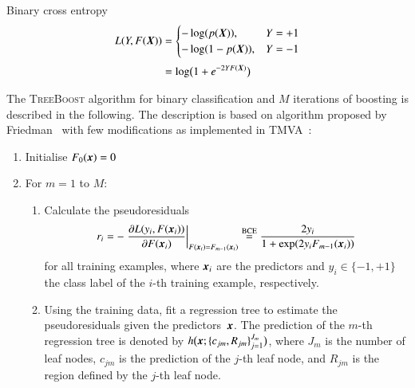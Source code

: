 Binary cross entropy
\begin{align*}
  L(Y, F(\myvec{X})) &=
  \begin{cases}
    - \log( p(\myvec{X}) ), & Y = +1 \\
    - \log( 1 - p(\myvec{X}) ), & Y = -1
  \end{cases} \\[0.3em]
                     &= \log\bigl( 1 + e^{-2 Y F(\myvec{X})} \bigr)
\end{align*}


The \textsc{TreeBoost} algorithm for binary classification and $M$ iterations of
boosting is described in the following. The description is based on algorithm
proposed by Friedman~\cite{Friedman:2001wbq} with few modifications as
implemented in TMVA~\cite{TMVA}:
\begin{enumerate}
  \setlength{\itemsep}{5pt}

\item Initialise $F_0(\myvec{x}) = 0$

\item For $m = 1$ to $M$:
  \begin{enumerate}
    \setlength{\itemsep}{5pt}

  \item Calculate the pseudoresiduals
    \begin{align*}
      r_i
      = - \left. \frac{\partial L(y_i, F(\myvec{x}_i))}{\partial F(\myvec{x}_i)}\right|_{F(\myvec{x}_i) = F_{m - 1}(\myvec{x}_i)}
      \overset{\text{BCE}}{=} \frac{2 y_i}{1 + \exp(2 y_i F_{m-1}(\myvec{x}_i))}
    \end{align*}
    for all training examples, where $\myvec{x}_i$ are the predictors and
    $y_i \in \{ -1, +1 \}$ the class label of the $i$-th training example,
    respectively.

  \item Using the training data, fit a regression tree to estimate the
    pseudoresiduals given the predictors~$\myvec{x}$. The prediction of the
    $m$-th regression tree is denoted by
    $h\bigl( \myvec{x}; \{c_{jm}, R_{jm}\}_{j=1}^{J_{m}} \bigr)$, where $J_{m}$
    is the number of leaf nodes, $c_{jm}$ is the prediction of the $j$-th leaf
    node, and $R_{jm}$ is the region defined by the $j$-th leaf node.


\end{enumerate}
\end{enumerate}
